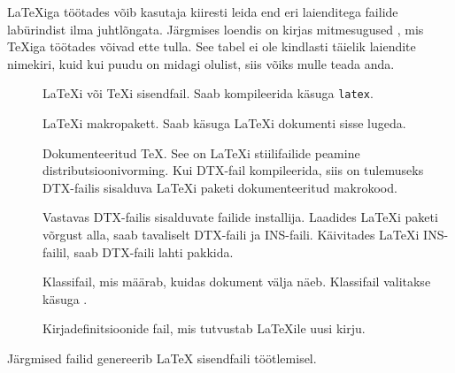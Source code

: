 {\LaTeX iga töötades võib kasutaja kiiresti leida end eri
laienditega failide labürindist ilma juhtlõngata.
Järgmises loendis on kirjas mitmesugused , mis \TeX iga
töötades võivad ette tulla. See tabel ei ole kindlasti täielik laiendite
nimekiri, kuid kui puudu on midagi olulist, siis võiks mulle teada anda.

\begin{description}

\item[] \LaTeX i või \TeX i sisendfail. Saab kompileerida
käsuga \texttt{latex}.
\item[] \LaTeX i makropakett. Saab käsuga 
\LaTeX i dokumenti sisse lugeda.
\item[] Dokumenteeritud \TeX{}. See on \LaTeX i stiilifailide
peamine distributsioonivorming. Kui DTX-fail kompileerida, siis on
tulemuseks DTX-failis sisalduva \LaTeX i paketi dokumenteeritud makrokood.
\item[] Vastavas DTX-failis sisalduvate failide
installija. Laadides \LaTeX i paketi võrgust alla, saab tavaliselt
DTX-faili ja INS-faili. Käivitades \LaTeX i INS-failil, saab DTX-faili
lahti pakkida.
\item[] Klassifail, mis määrab, kuidas dokument välja näeb.
Klassifail valitakse käsuga .
\item[] Kirjadefinitsioonide fail, mis tutvustab \LaTeX ile uusi
kirju.
\end{description}
Järgmised failid genereerib \LaTeX{} sisendfaili töötlemisel.

}

